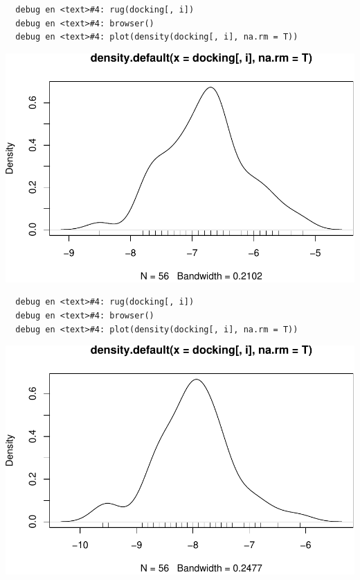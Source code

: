 \documentclass[12pt,twoside]{reedthesis}
\begin{document}
  \begin{verbatim}
  debug en <text>#4: rug(docking[, i])
  debug en <text>#4: browser()
  debug en <text>#4: plot(density(docking[, i], na.rm = T))
  \end{verbatim}
  
  \begin{center}\includegraphics{tesis_files/figure-latex/johan-7} \end{center}
  
  \begin{verbatim}
  debug en <text>#4: rug(docking[, i])
  debug en <text>#4: browser()
  debug en <text>#4: plot(density(docking[, i], na.rm = T))
  \end{verbatim}
  
  \begin{center}\includegraphics{tesis_files/figure-latex/johan-8} \end{center}
  
\end{document}
